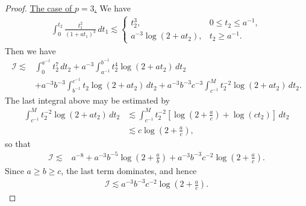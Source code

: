 \documentclass{amsart}
\numberwithin{equation}{section}
\numberwithin{equation}{section}
\begin{document}
\begin{proof}
\underline{The case of $p=3$.} We have
\begin{align*}
\int_0^{t_2}\frac{t_1^2}{(1+at_1)^3}\,dt_1
\lesssim
\begin{cases}
t_2^3, & 0\le t_2\le a^{-1},\\[4pt]
a^{-3}\log(2+at_2), & t_2\ge a^{-1}.
\end{cases}
\end{align*}
Then we have 
\begin{align*}
    \mathcal{I}
    \lesssim &\int_0^{a^{-1}}t_2^7\, dt_2
    +a^{-3}\int_{a^{-1}}^{b^{-1}}t_2^4\log(2+at_2)\, dt_2\\
    &+a^{-3}b^{-3}\int_{b^{-1}}^{c^{-1}}t_2\log(2+at_2)\, dt_2
    +a^{-3}b^{-3}c^{-3}\int_{c^{-1}}^{M}t_2^{-2}\log(2+at_2)\, dt_2.
\end{align*}
The last integral above may be estimated by 
\begin{align*}
 \int_{c^{-1}}^{M}t_2^{-2}\log(2+at_2)\,dt_2&
 \lesssim \int_{c^{-1}}^{M}t_2^{-2}\left[\log\left(2+\frac ac\right)+\log(ct_2)\right] \,dt_2\\
 &\lesssim c\log\left(2+\frac ac\right),
\end{align*}
so that 
\begin{align*}
    \mathcal{I}
    \lesssim &  a^{-8}+a^{-3}b^{-5}\log\left(2+\frac ab\right)
    +a^{-3}b^{-3}c^{-2}\log\left(2+\frac ac\right).
\end{align*}
Since $a\ge b\ge c$, the last term dominates, and hence
\begin{align*}
\mathcal I
\lesssim a^{-3}b^{-3}c^{-2}\log\!\left(2+\frac ac\right).
\end{align*}


\end{proof}
\end{document}
